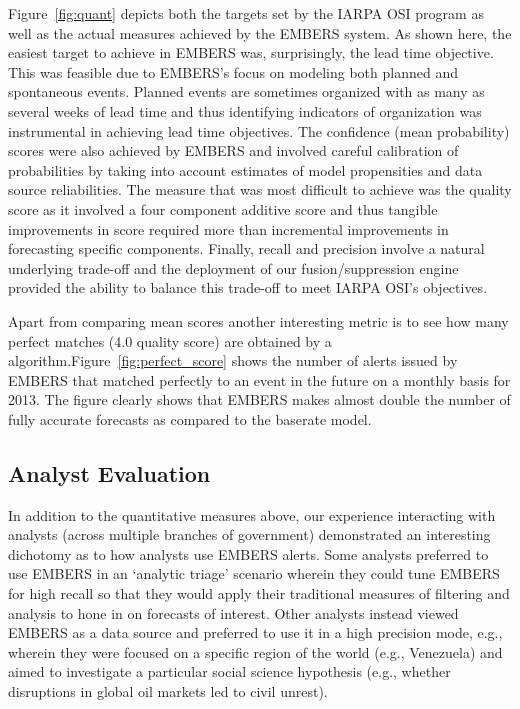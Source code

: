 Figure~\ref{fig:quant} depicts both the targets set by the IARPA OSI program as well as the
actual measures achieved by the EMBERS system. As shown here, the easiest target to achieve
in EMBERS was, surprisingly, the lead time objective. This was feasible due to EMBERS's focus on modeling
both planned and spontaneous events. Planned events are sometimes organized with as many as several weeks
of lead time and thus identifying indicators of organization was instrumental in achieving
lead time objectives. The confidence (mean probability) scores were also achieved by EMBERS and involved
careful calibration of probabilities by taking into account estimates of
model propensities and data source reliabilities. The measure that was most difficult to achieve
was the quality score as it involved a four component additive score and thus tangible improvements in
score required more than incremental improvements in forecasting specific components. Finally, recall
and precision involve a natural underlying trade-off and the deployment of our fusion/suppression
engine provided the ability to balance this trade-off to meet IARPA OSI's objectives.

Apart from comparing mean scores another interesting metric is to see
how many perfect matches (4.0 quality score) are obtained by a
algorithm.Figure~\ref{fig:perfect_score} shows the number of alerts issued
by EMBERS that matched perfectly to an event in the future on a monthly
basis for 2013.  The figure clearly shows that EMBERS makes almost double
the number of fully accurate forecasts as compared to the baserate
model.


\subsection{Analyst Evaluation}
In addition to the quantitative measures above, our experience interacting with analysts (across multiple
branches of government) demonstrated
an interesting dichotomy as to how analysts use EMBERS alerts. Some analysts preferred to use EMBERS in an
`analytic triage' scenario wherein they could tune EMBERS for high recall so that they would apply their
traditional measures of filtering and analysis to hone in on forecasts of interest. Other analysts
instead viewed EMBERS as a data source and preferred to use it in a high precision mode, e.g., wherein they
were focused on a specific region of the world (e.g., Venezuela) and aimed to investigate a particular
social science hypothesis (e.g., whether disruptions in global oil markets led to civil unrest).

